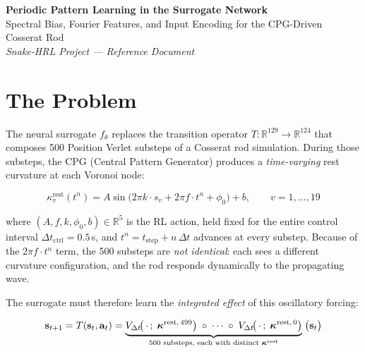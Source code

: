 \documentclass[11pt]{article}
\newcommand{\vect}[1]{\mathbf{#1}}
\newcommand{\Real}{\mathbb{R}}
\begin{document}

\begin{center}
  {\Large\bfseries Periodic Pattern Learning in the Surrogate Network} \\[0.5em]
  {\large Spectral Bias, Fourier Features, and Input Encoding for the CPG-Driven Cosserat Rod} \\[1.5em]
  \textit{Snake-HRL Project --- Reference Document}
\end{center}

\vspace{1em}

\section{The Problem}
\label{sec:problem}

The neural surrogate $f_\theta$ replaces the transition operator
$T\colon \Real^{129} \to \Real^{124}$ that composes 500 Position Verlet substeps of a
Cosserat rod simulation.
During those substeps, the CPG (Central Pattern Generator) produces a
\emph{time-varying} rest curvature at each Voronoi node:

\begin{equation}
  \kappa_v^{\mathrm{rest}}(t^n)
  = A \sin\!\bigl(2\pi k \cdot s_v + 2\pi f \cdot t^n + \phi_0\bigr) + b,
  \qquad v = 1, \ldots, 19
  \label{eq:cpg-substep}
\end{equation}

\noindent
where $(A, f, k, \phi_0, b) \in \Real^5$ is the RL action, held fixed for the entire
control interval $\Delta t_{\mathrm{ctrl}} = 0.5$\,s, and
$t^n = t_{\mathrm{step}} + n \,\Delta t$ advances at every substep.
Because of the $2\pi f \cdot t^n$ term, the 500 substeps are \emph{not identical}:
each sees a different curvature configuration, and the rod responds dynamically to
the propagating wave.

The surrogate must therefore learn the \emph{integrated effect} of this
oscillatory forcing:

\begin{equation}
  \vect{s}_{t+1} = T(\vect{s}_t, \vect{a}_t)
  = \underbrace{V_{\Delta t}\!\bigl(\,\cdot\,;\;\bm{\kappa}^{\mathrm{rest},\,499}\bigr)
    \;\circ\; \cdots \;\circ\;
    V_{\Delta t}\!\bigl(\,\cdot\,;\;\bm{\kappa}^{\mathrm{rest},\,0}\bigr)}_{%
    500 \text{ substeps, each with distinct } \bm{\kappa}^{\mathrm{rest}}}
  \;\bigl(\vect{s}_t\bigr)
\end{equation}
\end{document}
